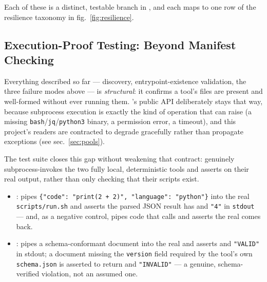 \documentclass[
]{article}
\providecommand{\tightlist}{%
  \setlength{\itemsep}{0pt}\setlength{\parskip}{0pt}}
\begin{document}
Each of these is a distinct, testable branch in
, and each maps to one row of the
resilience taxonomy in fig.~\ref{fig:resilience}.

\subsection{Execution-Proof Testing: Beyond Manifest
Checking}\label{execution-proof-testing-beyond-manifest-checking}

Everything described so far --- discovery, entrypoint-existence
validation, the three failure modes above --- is \emph{structural}: it
confirms a tool's files are present and well-formed without ever running
them. 's public API deliberately stays
that way, because subprocess execution is exactly the kind of operation
that can raise (a missing \texttt{bash}/\texttt{jq}/\texttt{python3}
binary, a permission error, a timeout), and this project's readers are
contracted to degrade gracefully rather than propagate exceptions (see
sec.~\ref{sec:pools}).

The test suite closes this gap without weakening that contract:
 genuinely subprocess-invokes the
two fully local, deterministic tools and asserts on their real output,
rather than only checking that their scripts exist.

\begin{itemize}
\tightlist
\item
  \textbf{}:
   pipes
  \texttt{\{"code":\ "print(2\ +\ 2)",\ "language":\ "python"\}} into
  the real \texttt{scripts/run.sh} and asserts the parsed JSON result
  has  and \texttt{"4"} in \texttt{stdout} ---
  and, as a negative control, pipes code that calls
   and asserts the real
   comes back.
\item
  \textbf{}: 
  pipes a schema-conformant document into the real
   and asserts 
  and \texttt{"VALID"} in stdout; a document missing the
  \texttt{version} field required by the tool's own \texttt{schema.json}
  is asserted to return  and
  \texttt{"INVALID"} --- a genuine, schema-verified violation, not an
  assumed one.
\end{itemize}
\end{document}
